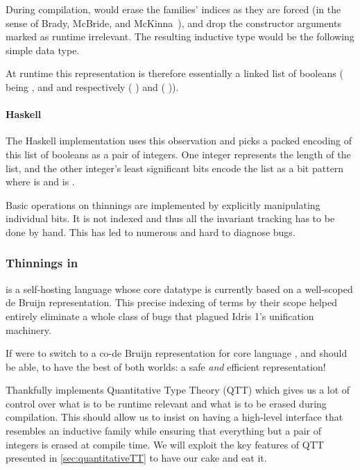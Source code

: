 During compilation, \idris{} would erase the families' indices as they are forced
(in the sense of Brady, McBride, and McKinna~\cite{DBLP:conf/types/BradyMM03}),
and drop the constructor arguments marked as runtime irrelevant.
%
The resulting inductive type would be the following simple data type.


At runtime this representation is therefore essentially a linked list of booleans
( being , and  and 
respectively ( \IdrisData{::}) and ( \IdrisData{::})).

\paragraph{Haskell}
The Haskell implementation uses this observation and picks a packed encoding
of this list of booleans as a pair of integers.
%
One integer represents the length  of the list, and the other
integer's  least significant bits encode the list as a bit pattern
where  is  and  is .

Basic operations on thinnings are implemented by explicitly manipulating individual bits.
%
It is not indexed and thus all the invariant tracking has to be done by hand.
This has led to numerous and hard to diagnose bugs.

\subsubsection{Thinnings in \idris}

\idris{} is a self-hosting language whose core datatype is currently based on
a well-scoped de Bruijn representation.
%
This precise indexing of terms by their scope helped entirely eliminate a whole
class of bugs that plagued Idris 1's unification machinery.

If \iftoggle{BLIND}{\idris{}}{we} were to switch to a co-de Bruijn
representation for \iftoggle{BLIND}{the}{our} core language
\iftoggle{BLIND}{the core developers would want}{we would want},
and should be able, to have the best of both worlds:
a safe \emph{and} efficient representation!

Thankfully \idris{} implements Quantitative Type Theory (QTT) which gives us a
lot of control over what is to be runtime relevant and what is to be erased
during compilation.
%
This should allow us to insist on having a high-level interface that resembles
an inductive family while ensuring that everything but a pair of integers is erased
at compile time.
%
We will exploit the key features of QTT presented in \cref{sec:quantitativeTT}
to have our cake and eat it.
